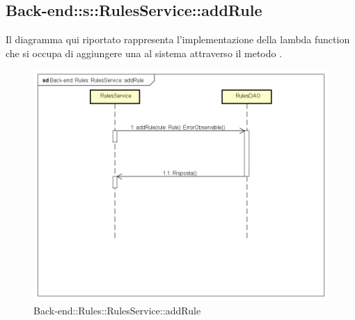 \subsection{Back-end::s::RulesService::addRule}
Il diagramma qui riportato rappresenta l'implementazione della lambda function che si occupa di aggiungere una  al sistema attraverso il metodo . 
 \begin{figure}[h] \centering \includegraphics[width=\textwidth,height=\textheight,keepaspectratio]{images/diagrams/back-end/Ufficial_Backend/Back-endRulesRulesServiceaddRule.png} 	\caption{Back-end::Rules::RulesService::addRule}
\end{figure} 
\newpage



